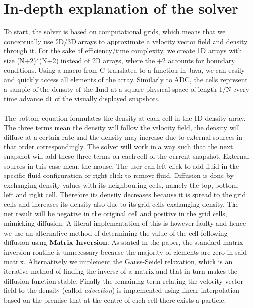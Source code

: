 \documentclass[12pt,a4paper]{book}
\begin{document}
\section{In-depth explanation of the solver}
To start, the solver is based on computational grids, which means that we conceptually use 2D/3D arrays to approximate a velocity vector field and density through it. For the sake of efficiency/time complexity, we create 1D arrays with size (N+2)*(N+2) instead of 2D arrays, where the +2 accounts for boundary conditions. Using a macro from C translated to a function in Java, we can easily and quickly access all elements of the array. Similarly to ADC, the cells represent a sample of the density of the fluid at a square physical space of length 1/N every time advance \verb|dt| of the visually displayed snapshots.\\
\\
The bottom equation formulates the density at each cell in the 1D density array. The three terms mean the density will follow the velocity field, the density will diffuse at a certain rate and the density may increase due to external sources in that order correspondingly. The solver will work in a way such that the next snapshot will add these three terms on each cell of the current snapshot. External sources in this case mean the mouse. The user can left click to add fluid in the specific fluid configuration or right click to remove fluid. Diffusion is done by exchanging density values with its neighbouring cells, namely the top, bottom, left and right cell. Therefore its density decreases because it is spread to the grid cells and increases its density also due to its grid cells exchanging density. The net result will be negative in the original cell and positive in the grid cells, mimicking diffusion. A literal implementation of this is however faulty and hence we use an alternative method of determining the value of the cell following diffusion using \textbf{Matrix Inversion}. As stated in the paper, the standard matrix inversion routine is unnecessary because the majority of elements are zero in said matrix. Alternatively we implement the Gauss-Seidel relaxation, which is an iterative method of finding the inverse of a matrix and that in turn makes the diffusion function stable. Finally the remaining term relating the velocity vector field to the density (called \emph{advection}) is implemented using linear interpolation based on the premise that at the centre of each cell there exists a particle.\\
\\
\end{document}
